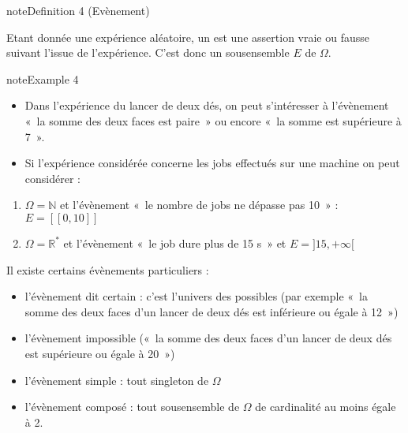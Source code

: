 \documentclass[letterpaper,10pt,french]{sphinxmanual}
\begin{document}
\ignorespaces \label{Rappels:evenement}
\begin{sphinxadmonition}{note}{Definition 4 (Evènement)}



\sphinxAtStartPar
Etant donnée une expérience aléatoire, un  est une assertion vraie ou fausse suivant l’issue de l’expérience. C’est donc un sous\sphinxhyphen{}ensemble \(E\) de \(\Omega\).
\end{sphinxadmonition}
\label{Rappels:example-6}
\begin{sphinxadmonition}{note}{Example 4}


\begin{itemize}
\item {} 
\sphinxAtStartPar
Dans l’expérience du lancer de deux dés, on peut s’intéresser à l’évènement « la somme des deux faces est paire » ou encore  « la somme est supérieure à 7 ».

\item {} 
\sphinxAtStartPar
Si l’expérience considérée concerne les jobs effectués sur une machine on peut considérer :

\end{itemize}
\begin{enumerate}
%
\item {} 
\sphinxAtStartPar
\(\Omega=\mathbb{N}\) et l’évènement « le nombre de jobs ne dépasse pas 10 » : \(E=[\![0,10]\!]\)

\item {} 
\sphinxAtStartPar
\(\Omega=\mathbb{R}^*\) et  l’évènement « le job dure plus de 15 s » et \(E=]15,+\infty[\)

\end{enumerate}
\end{sphinxadmonition}

\sphinxAtStartPar
Il existe certains évènements particuliers :
\begin{itemize}
\item {} 
\sphinxAtStartPar
l’évènement dit certain : c’est l’univers des possibles (par exemple « la somme des deux faces d’un lancer de deux dés est inférieure ou égale à 12 »)

\item {} 
\sphinxAtStartPar
l’évènement impossible (« la somme des deux faces d’un lancer de deux dés est supérieure ou égale à 20 »)

\item {} 
\sphinxAtStartPar
l’évènement simple : tout singleton de \(\Omega\)

\item {} 
\sphinxAtStartPar
l’évènement composé : tout sous\sphinxhyphen{}ensemble de \(\Omega\) de cardinalité au moins égale à 2.

\end{itemize}
\end{document}
